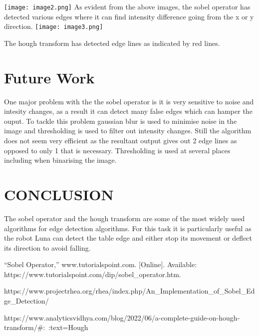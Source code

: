 \documentclass[letterpaper, 10 pt, conference]{ieeeconf}
\begin{document}
    \centering
    \texttt{[image: image2.png]}
As evident from the above images, the sobel operator has detected various edges where it can find intensity difference going from the x or y direction.
    \centering
    \texttt{[image: image3.png]}
    
The hough transform has detected edge lines as indicated by red lines.



\section{Future Work}

One major problem with the the sobel operator is it is very sensitive to noise and intesity changes, as a result it can detect many false edges which can hamper the ouput.
To tackle this problem gaussian blur is used to minimise noise in the image and thresholding is used to filter out intensity changes. Still the algorithm does not seem very efficient as the resultant output gives out 2 edge lines as opposed to only 1 that is necessary. Thresholding is used at several places including when binarising the image.

\section*{CONCLUSION}
The sobel operator and the hough transform are some of the most widely used algorithms for edge detection algorithms. For this task it is particularly useful as the robot Luna can detect the table edge and either stop its movement or deflect its direction to avoid falling.

\begin{thebibliography}{99} 
“Sobel Operator,” www.tutorialspoint.com. [Online]. Available: https://www.tutorialspoint.com/dip/sobel_operator.htm. 

 https://www.projectrhea.org/rhea/index.php/An_Implementation_of_Sobel_Edge_Detection/

 https://www.analyticsvidhya.com/blog/2022/06/a-complete-guide-on-hough-transform/#:~:text=Hough%

\end{thebibliography}
\end{document}
